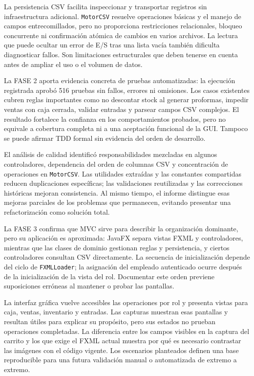 La persistencia CSV facilita inspeccionar y transportar registros sin infraestructura adicional. \texttt{MotorCSV} resuelve operaciones básicas y el manejo de campos entrecomillados, pero no proporciona restricciones relacionales, bloqueo concurrente ni confirmación atómica de cambios en varios archivos. La lectura que puede ocultar un error de E/S tras una lista vacía también dificulta diagnosticar fallos. Son limitaciones estructurales que deben tenerse en cuenta antes de ampliar el uso o el volumen de datos.

La FASE 2 aporta evidencia concreta de pruebas automatizadas: la ejecución registrada aprobó 516 pruebas sin fallos, errores ni omisiones. Los casos existentes cubren reglas importantes como no descontar stock al generar proformas, impedir ventas con caja cerrada, validar entradas y parsear campos CSV complejos. El resultado fortalece la confianza en los comportamientos probados, pero no equivale a cobertura completa ni a una aceptación funcional de la GUI. Tampoco se puede afirmar TDD formal sin evidencia del orden de desarrollo.

El análisis de calidad identificó responsabilidades mezcladas en algunos controladores, dependencia del orden de columnas CSV y concentración de operaciones en \texttt{MotorCSV}. Las utilidades extraídas y las constantes compartidas reducen duplicaciones específicas; las validaciones reutilizadas y las correcciones históricas mejoran consistencia. Al mismo tiempo, el informe distingue esas mejoras parciales de los problemas que permanecen, evitando presentar una refactorización como solución total.

La FASE 3 confirma que MVC sirve para describir la organización dominante, pero su aplicación es aproximada: JavaFX separa vistas FXML y controladores, mientras que las clases de dominio gestionan reglas y persistencia, y ciertos controladores consultan CSV directamente. La secuencia de inicialización depende del ciclo de \texttt{FXMLLoader}; la asignación del empleado autenticado ocurre después de la inicialización de la vista del rol. Documentar este orden previene suposiciones erróneas al mantener o probar las pantallas.

La interfaz gráfica vuelve accesibles las operaciones por rol y presenta vistas para caja, ventas, inventario y entradas. Las capturas muestran esas pantallas y resultan útiles para explicar su propósito, pero sus estados no prueban operaciones completadas. La diferencia entre los campos visibles en la captura del carrito y los que exige el FXML actual muestra por qué es necesario contrastar las imágenes con el código vigente. Los escenarios planteados definen una base reproducible para una futura validación manual o automatizada de extremo a extremo.

